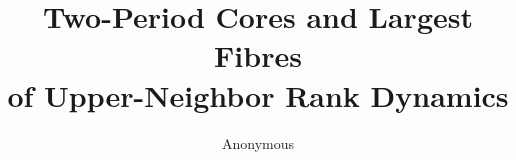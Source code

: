 \documentclass[a4paper,10pt]{amsart}
\title[Upper-neighbor rank dynamics]{Two-Period Cores and Largest Fibres\protect\\ of Upper-Neighbor Rank Dynamics}
\author{Anonymous}
\date{}
\begin{document}
\begin{abstract}

\end{abstract}
\maketitle







\end{document}
